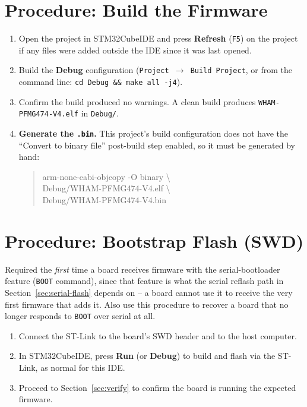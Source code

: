 \documentclass[11pt]{article}
\newcommand{\code}[1]{\texttt{#1}}
\begin{document}
\section{Procedure: Build the Firmware}
\label{sec:build}

\begin{enumerate}[label=\arabic*.]
  \item Open the project in STM32CubeIDE and press \textbf{Refresh}
    (\code{F5}) on the project if any files were added outside the IDE
    since it was last opened.
  \item Build the \textbf{Debug} configuration (\code{Project~$\to$~Build
    Project}, or from the command line: \code{cd Debug \&\& make all -j4}).
  \item Confirm the build produced no warnings. A clean build produces
    \code{WHAM-PFMG474-V4.elf} in \code{Debug/}.
  \item \textbf{Generate the \code{.bin}.} This project's build
    configuration does not have the ``Convert to binary file'' post-build
    step enabled, so it must be generated by hand:
\begin{quote}\ttfamily\small\raggedright
arm-none-eabi-objcopy -O binary \textbackslash\\
\hspace*{1em}Debug/WHAM-PFMG474-V4.elf \textbackslash\\
\hspace*{1em}Debug/WHAM-PFMG474-V4.bin
\end{quote}
\end{enumerate}

\section{Procedure: Bootstrap Flash (SWD)}
\label{sec:bootstrap}

Required the \emph{first} time a board receives firmware with the
serial-bootloader feature (\code{BOOT} command), since that feature is
what the serial reflash path in Section~\ref{sec:serial-flash} depends
on -- a board cannot use it to receive the very first firmware that adds
it. Also use this procedure to recover a board that no longer responds
to \code{BOOT} over serial at all.

\begin{enumerate}[label=\arabic*.]
  \item Connect the ST-Link to the board's SWD header and to the host
    computer.
  \item In STM32CubeIDE, press \textbf{Run} (or \textbf{Debug}) to build
    and flash via the ST-Link, as normal for this IDE.
  \item Proceed to Section~\ref{sec:verify} to confirm the board is
    running the expected firmware.
\end{enumerate}
\end{document}
